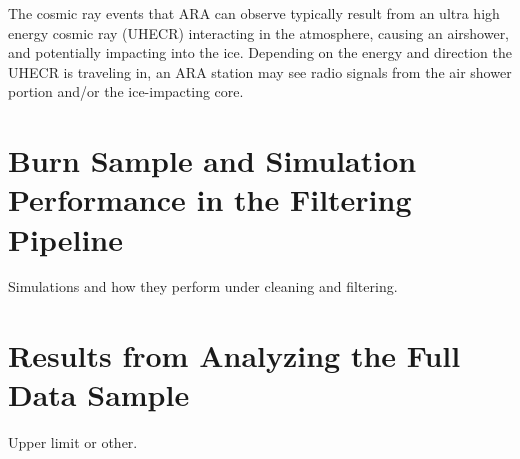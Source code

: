     The cosmic ray events that ARA can observe typically result from an ultra high energy cosmic ray (UHECR) interacting in the atmosphere, causing an airshower, and potentially impacting into the ice. 
    Depending on the energy and direction the UHECR is traveling in, an ARA station may see radio signals from the air shower portion and/or the ice-impacting core. 
    
  
  
\section{Burn Sample and Simulation Performance in the Filtering Pipeline}

  Simulations and how they perform under cleaning and filtering.
  
\section{Results from Analyzing the Full Data Sample}

  Upper limit or other. 